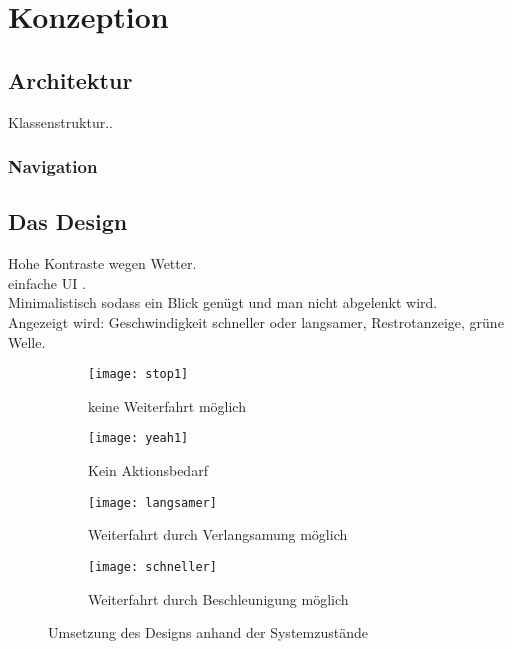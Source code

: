 \chapter{\label{chap:entwurf}Konzeption}
\section{Architektur}
Klassenstruktur..
\subsection{Navigation}
\section{Das Design}
Hohe Kontraste wegen Wetter.\\
einfache UI .\\
Minimalistisch sodass ein Blick genügt und man nicht abgelenkt wird.\\
Angezeigt wird: Geschwindigkeit schneller oder langsamer, 
Restrotanzeige, grüne Welle.
\begin{figure}[H]
        \centering
           \begin{subfigure}[t]{0.23\textwidth}
                \texttt{[image: stop1]}
                \caption[Systemzustand d]{keine Weiterfahrt möglich}
                \label{fig:schneller}
        \end{subfigure}
           \hfill 
              \begin{subfigure}[t]{0.23\textwidth}
                \texttt{[image: yeah1]}
                \caption[Systemzustand c]{Kein Aktionsbedarf}
                \label{fig:langsamer}
        \end{subfigure}
           \hfill
        \begin{subfigure}[t]{0.23\textwidth}
                \texttt{[image: langsamer]}
                \caption[Systemzustand a]{Weiterfahrt durch Verlangsamung möglich}
                \label{fig:langsamer}
        \end{subfigure}
        \hfill
        \begin{subfigure}[t]{0.23\textwidth}
                \texttt{[image: schneller]}
                \caption[Systemzustand b]{Weiterfahrt durch Beschleunigung möglich}
                \label{fig:schneller}
        \end{subfigure}     
        \caption[Systemzustände im Ampelbereich]{Umsetzung des Designs anhand der Systemzustände}
        \label{fig:mockup}
\end{figure} 
